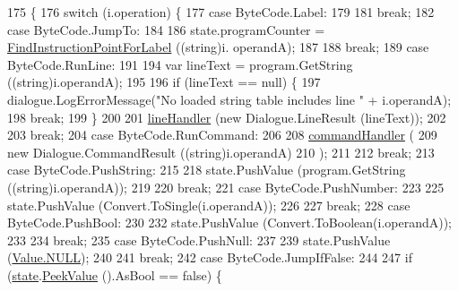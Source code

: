 \begin{DoxyCode}
175                                                     \{
176             \textcolor{keywordflow}{switch} (i.operation) \{
177             \textcolor{keywordflow}{case} ByteCode.Label:
179 
181                 \textcolor{keywordflow}{break};
182             \textcolor{keywordflow}{case} ByteCode.JumpTo:
184 
186                 state.programCounter = \hyperlink{a00156_af613c8b2d098678b6ea05b509c0a0cb6}{FindInstructionPointForLabel} ((\textcolor{keywordtype}{string})i.
      operandA);
187 
188                 \textcolor{keywordflow}{break};
189             \textcolor{keywordflow}{case} ByteCode.RunLine:
191 
194                 var lineText = program.GetString ((string)i.operandA);
195 
196                 \textcolor{keywordflow}{if} (lineText == null) \{
197                     dialogue.LogErrorMessage(\textcolor{stringliteral}{"No loaded string table includes line "} + i.operandA);
198                     \textcolor{keywordflow}{break};
199                 \}
200 
201                 \hyperlink{a00156_a29b30454f068fc7e107d48bff4346fd9}{lineHandler} (\textcolor{keyword}{new} Dialogue.LineResult (lineText));
202 
203                 \textcolor{keywordflow}{break};
204             \textcolor{keywordflow}{case} ByteCode.RunCommand:
206 
208                 \hyperlink{a00156_ab89b02227b92c74552f719afd47848e4}{commandHandler} (
209                     \textcolor{keyword}{new} Dialogue.CommandResult ((\textcolor{keywordtype}{string})i.operandA)
210                 );
211 
212                 \textcolor{keywordflow}{break};
213             \textcolor{keywordflow}{case} ByteCode.PushString:
215 
218                 state.PushValue (program.GetString ((string)i.operandA));
219 
220                 \textcolor{keywordflow}{break};
221             \textcolor{keywordflow}{case} ByteCode.PushNumber:
223 
225                 state.PushValue (Convert.ToSingle(i.operandA));
226 
227                 \textcolor{keywordflow}{break};
228             \textcolor{keywordflow}{case} ByteCode.PushBool:
230 
232                 state.PushValue (Convert.ToBoolean(i.operandA));
233 
234                 \textcolor{keywordflow}{break};
235             \textcolor{keywordflow}{case} ByteCode.PushNull:
237 
239                 state.PushValue (\hyperlink{a00181_a1ed2964965baca8621c45efa23f37660}{Value.NULL});
240 
241                 \textcolor{keywordflow}{break};
242             \textcolor{keywordflow}{case} ByteCode.JumpIfFalse:
244 
247                 \textcolor{keywordflow}{if} (\hyperlink{a00156_a70f2ce6201cdd2430ceaa764ac614ca0}{state}.\hyperlink{a00159_a54fd5b64ec94e937e771846167242dc2}{PeekValue} ().AsBool == \textcolor{keyword}{false}) \{

\end{DoxyCode}
